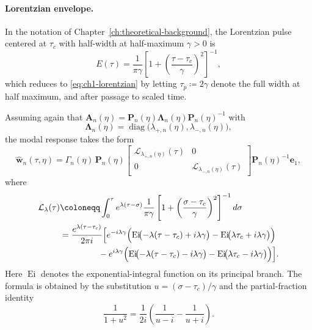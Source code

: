 \paragraph{Lorentzian envelope.}
In the notation of Chapter~\ref{ch:theoretical-background}, the Lorentzian pulse centered at \(\tau_c\)
with half-width at half-maximum \(\gamma>0\) is
\begin{equation}
    E(\tau)
    =
    \frac{1}{\pi\gamma}
    \left[
        1+\left(\frac{\tau-\tau_c}{\gamma}\right)^2
        \right]^{-1},
    \label{eq:appE-lorentzian-envelope}
\end{equation}
which reduces to \eqref{eq:ch1-lorentzian} by letting \(\tau_p \coloneqq 2\gamma\) denote the full width at half maximum,
and after passage to scaled time.

Assuming again that
\(
\mathbf{A}_n(\eta)=\mathbf{P}_n(\eta)\mathbf{\Lambda}_n(\eta)\mathbf{P}_n(\eta)^{-1}
\)
with
\[
    \mathbf{\Lambda}_n(\eta)
    =
    \operatorname{diag}\bigl(\lambda_{+,n}(\eta),\lambda_{-,n}(\eta)\bigr),
\]
the modal response takes the form
\begin{equation}
    \widehat{\mathbf{w}}_n(\tau,\eta)
    =
    \Gamma_n(\eta)\,
    \mathbf{P}_n(\eta)
    \begin{bmatrix}
        \mathcal{L}_{\lambda_{+,n}(\eta)}(\tau) & 0                                       \\
        0                                       & \mathcal{L}_{\lambda_{-,n}(\eta)}(\tau)
    \end{bmatrix}
    \mathbf{P}_n(\eta)^{-1}\mathbf{e}_1,
    \label{eq:appE-lorentzian-modal-solution}
\end{equation}
where
\begin{align}
    \mathcal{L}_{\lambda}(\tau)
     & \coloneqq
    \int_0^\tau
    e^{\lambda(\tau-\sigma)}
    \frac{1}{\pi\gamma}
    \left[
        1+\left(\frac{\sigma-\tau_c}{\gamma}\right)^2
        \right]^{-1}
    d\sigma
    \notag            \\
     & =
    \frac{e^{\lambda(\tau-\tau_c)}}{2\pi i}
    \Bigl[
        e^{-i\lambda\gamma}
        \Bigl(
        \operatorname{Ei}\!\bigl(-\lambda(\tau-\tau_c)+i\lambda\gamma\bigr)
        -
        \operatorname{Ei}\!\bigl(\lambda\tau_c+i\lambda\gamma\bigr)
        \Bigr)
    \notag            \\
     & \hspace{4.5em}
        -
        e^{i\lambda\gamma}
        \Bigl(
        \operatorname{Ei}\!\bigl(-\lambda(\tau-\tau_c)-i\lambda\gamma\bigr)
        -
        \operatorname{Ei}\!\bigl(\lambda\tau_c-i\lambda\gamma\bigr)
        \Bigr)
        \Bigr].
    \label{eq:appE-lorentzian-convolution}
\end{align}
Here \(\operatorname{Ei}\) denotes the exponential-integral function on its
principal branch. The formula is obtained by the substitution
\(
u=(\sigma-\tau_c)/\gamma
\)
and the partial-fraction identity
\[
    \frac{1}{1+u^2}
    =
    \frac{1}{2i}
    \left(
    \frac{1}{u-i}-\frac{1}{u+i}
    \right).
\]


